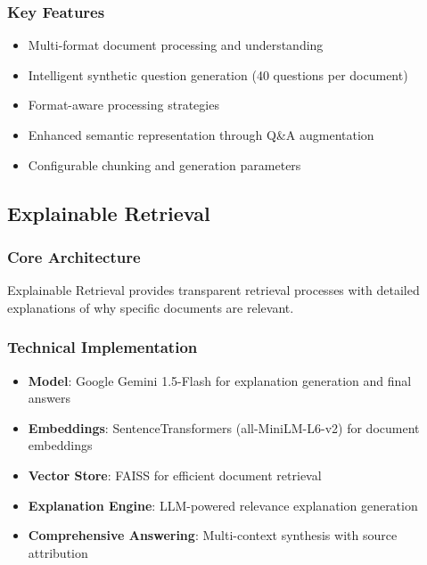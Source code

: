 \documentclass[12pt,a4paper]{article}
\begin{document}
\subsubsection{Key Features}
\begin{itemize}
    \item Multi-format document processing and understanding
    \item Intelligent synthetic question generation (40 questions per document)
    \item Format-aware processing strategies
    \item Enhanced semantic representation through Q\&A augmentation
    \item Configurable chunking and generation parameters
\end{itemize}

\subsection{Explainable Retrieval}

\subsubsection{Core Architecture}
Explainable Retrieval provides transparent retrieval processes with detailed explanations of why specific documents are relevant.

\subsubsection{Technical Implementation}
\begin{itemize}
    \item \textbf{Model}: Google Gemini 1.5-Flash for explanation generation and final answers
    \item \textbf{Embeddings}: SentenceTransformers (all-MiniLM-L6-v2) for document embeddings
    \item \textbf{Vector Store}: FAISS for efficient document retrieval
    \item \textbf{Explanation Engine}: LLM-powered relevance explanation generation
    \item \textbf{Comprehensive Answering}: Multi-context synthesis with source attribution
\end{itemize}
\end{document}
